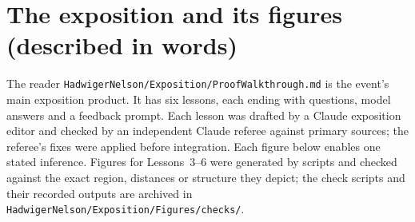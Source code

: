 \documentclass[11pt]{article}
\theoremstyle{definition}
\theoremstyle{remark}
\begin{document}
\section{The exposition and its figures (described in words)}
The reader \texttt{Hadwiger\allowbreak{}Nelson/\allowbreak{}Exposition/\allowbreak{}Proof\allowbreak{}Walkthrough.\allowbreak{}md} is the event's main exposition product. It has six lessons, each ending with questions, model answers and a feedback prompt. Each lesson was drafted by a Claude exposition editor and checked by an independent Claude referee against primary sources; the referee's fixes were applied before integration. Each figure below enables one stated inference. Figures for Lessons~3--6 were generated by scripts and checked against the exact region, distances or structure they depict; the check scripts and their recorded outputs are archived in \texttt{HadwigerNelson/\allowbreak{}Exposition/\allowbreak{}Figures/\allowbreak{}checks/\allowbreak{}}.
\end{document}
